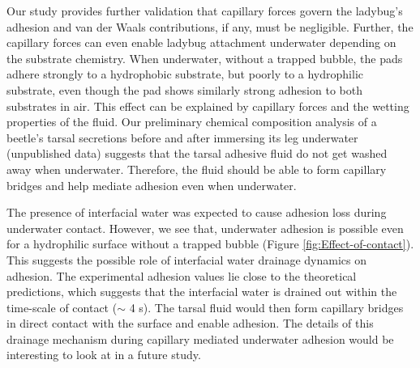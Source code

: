 \documentclass[vruler,JEB]{COB}%
\begin{document}
Our study provides further validation that capillary forces govern the ladybug's adhesion and van der Waals contributions,
if any, must be negligible. Further, the capillary forces can even
enable ladybug attachment underwater depending on the substrate chemistry.
When underwater, without a trapped bubble, the pads adhere strongly
to a hydrophobic substrate, but poorly to a hydrophilic substrate,
even though the pad shows similarly strong adhesion to both substrates
in air. This effect can be explained by capillary forces and the wetting properties of the fluid. Our
preliminary chemical composition analysis of a beetle's tarsal secretions before and after immersing its leg underwater (unpublished data) suggests that the tarsal adhesive fluid do not get washed away when underwater. Therefore, the fluid should be able to form capillary bridges and help mediate adhesion even when underwater.

The presence of interfacial water was expected to cause adhesion loss during underwater contact. However, we see that, underwater adhesion is possible even for a hydrophilic surface without a trapped bubble (Figure \ref{fig:Effect-of-contact}). This suggests the possible role of interfacial water drainage dynamics on adhesion. The experimental adhesion values lie close to the theoretical predictions, which suggests that the interfacial water is drained out within the time-scale of contact ($\sim$ 4 s). The tarsal fluid would then form capillary bridges in direct contact with the surface and enable adhesion. The details of this drainage mechanism during capillary mediated underwater adhesion would be interesting to look at in a future study.
\end{document}
